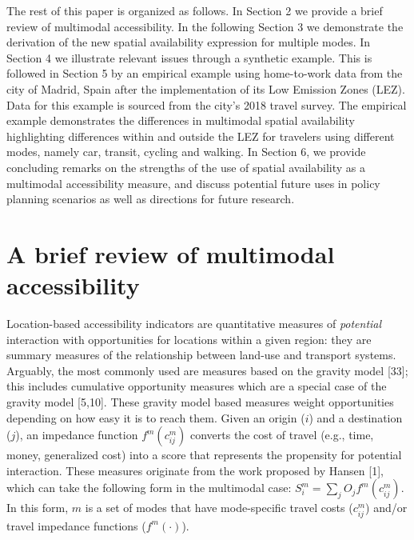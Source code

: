 \documentclass[10pt,letterpaper]{article}
\begin{document}
The rest of this paper is organized as follows. In Section 2 we provide
a brief review of multimodal accessibility. In the following Section 3
we demonstrate the derivation of the new spatial availability expression
for multiple modes. In Section 4 we illustrate relevant issues through a
synthetic example. This is followed in Section 5 by an empirical example
using home-to-work data from the city of Madrid, Spain after the
implementation of its Low Emission Zones (LEZ). Data for this example is
sourced from the city's 2018 travel survey. The empirical example
demonstrates the differences in multimodal spatial availability
highlighting differences within and outside the LEZ for travelers using
different modes, namely car, transit, cycling and walking. In Section 6,
we provide concluding remarks on the strengths of the use of spatial
availability as a multimodal accessibility measure, and discuss
potential future uses in policy planning scenarios as well as directions
for future research.

\hypertarget{a-brief-review-of-multimodal-accessibility}{%
\section{A brief review of multimodal
accessibility}\label{a-brief-review-of-multimodal-accessibility}}

Location-based accessibility indicators are quantitative measures of
\emph{potential} interaction with opportunities for locations within a
given region: they are summary measures of the relationship between
land-use and transport systems. Arguably, the most commonly used are
measures based on the gravity model {[}33{]}; this includes cumulative
opportunity measures which are a special case of the gravity model
{[}5,10{]}. These gravity model based measures weight opportunities
depending on how easy it is to reach them. Given an origin (\(i\)) and a
destination (\(j\)), an impedance function \(f^{m}(c^m_{ij})\) converts
the cost of travel (e.g., time, money, generalized cost) into a score
that represents the propensity for potential interaction. These measures
originate from the work proposed by Hansen {[}1{]}, which can take the
following form in the multimodal case:
\(S_i^m = \sum_j O_j f^m(c_{ij}^m)\). In this form, \(m\) is a set of
modes that have mode-specific travel costs (\(c_{ij}^m\)) and/or travel
impedance functions (\(f^m(\cdot)\)).
\end{document}

